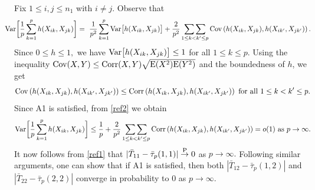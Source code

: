 \documentclass[twoside]{article}
\newcommand{\0}{\mathbf{0}}
\newcommand{\1}{\mathbf{1}}
\numberwithin{equation}{section}
\begin{document}
\begin{enumerate}[(a)]
Fix $1\leq i,j\leq n_1$ with $i\neq j$. Observe that
\begin{align}\label{ref2}
\hspace{-0.5cm}{\rm Var}\bigg [\frac{1}{p}\sum_{k=1}^p h(X_{ik},X_{jk})\bigg ]
=\ \frac{1}{p^2}\sum_{k=1}^p {\rm Var}\big [h(X_{ik},X_{jk})\big ]
 +\frac{2}{p^2}\mathop{\sum\sum}_{1\leq k< k^\prime\leq p} {\rm Cov}\left(h(X_{ik},X_{jk}),h(X_{ik^\prime},X_{jk^\prime})\right).
\end{align}
Since $0\leq h\leq 1,$ we have $ {\rm Var}\big [h(X_{ik},X_{jk})\big ]\leq 1$ for all $1\le k\le p.$ Using the inequality ${\rm Cov}(X,Y)\leq {\rm Corr}(X,Y)\sqrt{{\rm E}(X^2){\rm E}(Y^2)}$ and the boundedness of $h$, we get
\begin{align*}
{\rm Cov}\left(h(X_{ik},X_{jk}),h(X_{ik^\prime},X_{jk^\prime})\right)\leq {\rm Corr}\left(h(X_{ik},X_{jk}),h(X_{ik^\prime},X_{jk^\prime})\right)\text{ for all }1\leq k<k^\prime\leq p.
\end{align*}
Since A1 is satisfied, from \eqref{ref2} we obtain
\begin{align*}
{\rm Var}\bigg [\frac{1}{p}\sum_{k=1}^p h(X_{ik},X_{jk})\bigg ]
\leq \frac{1}{p} +\frac{2}{p^2}\mathop{\sum\sum}_{1\leq k< k^\prime\leq p} {\rm Corr}\left(h(X_{ik},X_{jk}),h(X_{ik^\prime},X_{jk^\prime})\right)
= o(1)\text{ as }p\to\infty.
\end{align*}
It now follows from \eqref{ref1} that $|\bar{T}_{11}-\bar{\tau}_p(1,1)|\stackrel{\rm P}{\to}0$ as $p\to\infty.$ Following similar arguments, one can show that if A1 is satisfied, then both $|\bar{T}_{12}-\bar{\tau}_p(1,2)|$ and $|\bar{T}_{22}-\bar{\tau}_p(2,2)|$ converge in probability to 0 as $p\to\infty$.


\end{enumerate}
\end{document}
